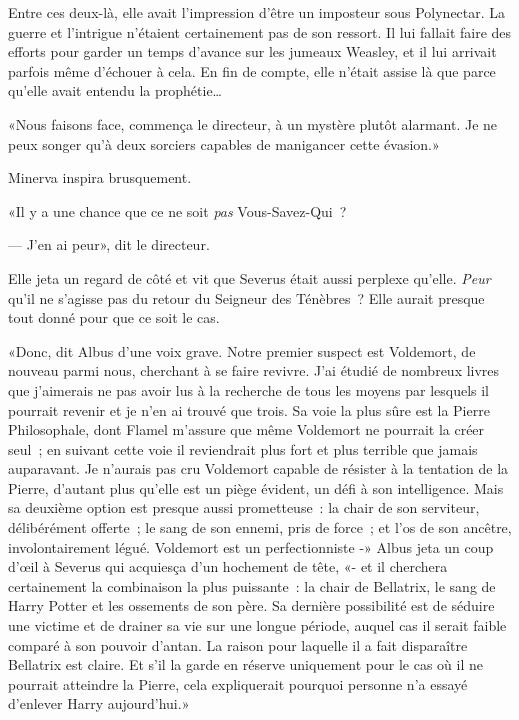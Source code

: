 Entre ces deux-là, elle avait l'impression d'être un imposteur sous Polynectar. La guerre et l'intrigue n'étaient certainement pas de son ressort. Il lui fallait faire des efforts pour garder un temps d'avance sur les jumeaux Weasley, et il lui arrivait parfois même d'échouer à cela. En fin de compte, elle n'était assise là que parce qu'elle avait entendu la prophétie…

«Nous faisons face, commença le directeur, à un mystère plutôt alarmant. Je ne peux songer qu'à deux sorciers capables de manigancer cette évasion.»

Minerva inspira brusquement.

«Il y a une chance que ce ne soit \emph{pas} Vous-Savez-Qui~?

--- J'en ai peur», dit le directeur.

Elle jeta un regard de côté et vit que Severus était aussi perplexe qu'elle. \emph{Peur} qu'il ne s'agisse pas du retour du Seigneur des Ténèbres~? Elle aurait presque tout donné pour que ce soit le cas.

«Donc, dit Albus d'une voix grave. Notre premier suspect est Voldemort, de nouveau parmi nous, cherchant à se faire revivre. J'ai étudié de nombreux livres que j'aimerais ne pas avoir lus à la recherche de tous les moyens par lesquels il pourrait revenir et je n'en ai trouvé que trois. Sa voie la plus sûre est la Pierre Philosophale, dont Flamel m'assure que même Voldemort ne pourrait la créer seul~; en suivant cette voie il reviendrait plus fort et plus terrible que jamais auparavant. Je n'aurais pas cru Voldemort capable de résister à la tentation de la Pierre, d'autant plus qu'elle est un piège évident, un défi à son intelligence. Mais sa deuxième option est presque aussi prometteuse~: la chair de son serviteur, délibérément offerte~; le sang de son ennemi, pris de force~; et l'os de son ancêtre, involontairement légué. Voldemort est un perfectionniste -» Albus jeta un coup d'œil à Severus qui acquiesça d'un hochement de tête, «- et il cherchera certainement la combinaison la plus puissante~: la chair de Bellatrix, le sang de Harry Potter et les ossements de son père. Sa dernière possibilité est de séduire une victime et de drainer sa vie sur une longue période, auquel cas il serait faible comparé à son pouvoir d'antan. La raison pour laquelle il a fait disparaître Bellatrix est claire. Et s'il la garde en réserve uniquement pour le cas où il ne pourrait atteindre la Pierre, cela expliquerait pourquoi personne n'a essayé d'enlever Harry aujourd'hui.»

